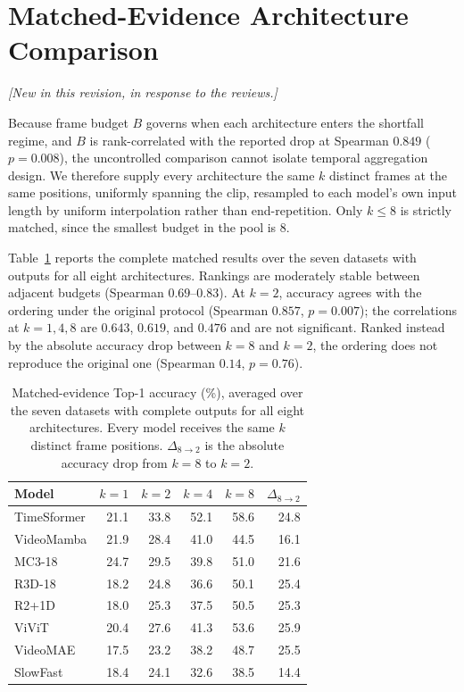 \documentclass[runningheads]{llncs}
\newcommand{\tabtight}{\setlength{\tabcolsep}{3.5pt}\renewcommand{\arraystretch}{1.12}}
\newcommand{\rev}[1]{\textcolor{revblue}{#1}}
\newcommand{\revnote}{\noindent\textcolor{revblue}{\small\itshape
  [New in this revision, in response to the reviews.]}\par\vspace{2pt}}
\begin{document}
\section{\rev{Matched-Evidence Architecture Comparison}}
\revnote
\label{sec:sup_matched}

Because frame budget $B$ governs when each architecture enters the shortfall
regime, and $B$ is rank-correlated with the reported drop at Spearman $0.849$
($p{=}0.008$), the uncontrolled comparison cannot isolate temporal aggregation
design. We therefore supply every architecture the same $k$ distinct frames at
the same positions, uniformly spanning the clip, resampled to each model's own
input length by uniform interpolation rather than end-repetition. Only
$k\leq8$ is strictly matched, since the smallest budget in the pool is 8.

Table~\ref{tab:sup_matched_models} reports the complete matched results over the
seven datasets with outputs for all eight architectures. Rankings are moderately
stable between adjacent budgets (Spearman $0.69$--$0.83$). At $k{=}2$, accuracy
agrees with the ordering under the original protocol (Spearman $0.857$,
$p{=}0.007$); the correlations at $k{=}1,4,8$ are $0.643$, $0.619$, and $0.476$
and are not significant. Ranked instead by the absolute accuracy drop between
$k{=}8$ and $k{=}2$, the ordering does not reproduce the original one (Spearman
$0.14$, $p{=}0.76$).

\begin{table}[!htbp]
\centering
\caption{Matched-evidence Top-1 accuracy (\%), averaged over the seven datasets
with complete outputs for all eight architectures. Every model receives the
same $k$ distinct frame positions. $\Delta_{8\to2}$ is the absolute accuracy
drop from $k=8$ to $k=2$.}
\label{tab:sup_matched_models}
\scriptsize\tabtight
\begin{tabular}{l rrrrr}
\toprule
Model & $k=1$ & $k=2$ & $k=4$ & $k=8$ & $\Delta_{8\to2}$ \\
\midrule
TimeSformer & 21.1 & 33.8 & 52.1 & 58.6 & 24.8 \\
VideoMamba  & 21.9 & 28.4 & 41.0 & 44.5 & 16.1 \\
MC3-18      & 24.7 & 29.5 & 39.8 & 51.0 & 21.6 \\
R3D-18      & 18.2 & 24.8 & 36.6 & 50.1 & 25.4 \\
R2+1D       & 18.0 & 25.3 & 37.5 & 50.5 & 25.3 \\
ViViT       & 20.4 & 27.6 & 41.3 & 53.6 & 25.9 \\
VideoMAE    & 17.5 & 23.2 & 38.2 & 48.7 & 25.5 \\
SlowFast    & 18.4 & 24.1 & 32.6 & 38.5 & 14.4 \\
\bottomrule
\end{tabular}
\end{table}
\end{document}
